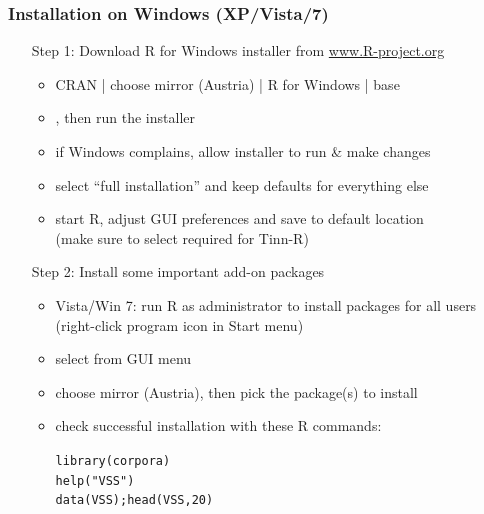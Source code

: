 \documentclass[t]{beamer} %
\begin{document}
\begin{frame}[fragile]
  \frametitle{Installation on Windows (XP/Vista/7)}
  
  \begin{itemize}
  \item[Step 1:] Download R for Windows installer from \url{www.R-project.org}
    \begin{itemize}
    \item CRAN | choose mirror (Austria) | R for Windows | base
    \item {}, then run the installer
    \item if Windows complains, allow installer to run \& make changes
    \item select ``full installation'' and keep defaults for everything else
    \item start R, adjust GUI preferences and save to default location\\
      (make sure to select  required for Tinn-R)
    \item[]
    \end{itemize}
    \pause
  \item[Step 2:] Install some important add-on packages
    \begin{itemize}
    \item Vista/Win 7: run R as administrator to install packages for all
      users (right-click program icon in Start menu)
    \item select  from GUI menu
    \item choose mirror (Austria), then pick the package(s) to install
    \item check successful installation with these R commands:
      \begin{scriptsize}
        \begin{alltt}
library(corpora)
help("VSS") 
data(VSS); head(VSS, 20)
        \end{alltt}
      \end{scriptsize}
    \end{itemize}
  \end{itemize}
\end{frame}
\end{document}
